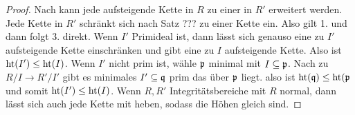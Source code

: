 \begin{proof}
	Nach  kann jede aufsteigende Kette in \(R\) zu einer in \(R'\) erweitert werden. Jede Kette in \(R'\)
	schränkt sich nach Satz ??? zu einer Kette ein. Also gilt 1. und dann folgt 3. direkt.
	Wenn \(I'\) Primideal ist, dann lässt sich genauso eine zu \( I' \) aufsteigende Kette einschränken und gibt eine zu \( I \) aufsteigende Kette.
	Also ist \( \mathrm{ht}(I')\leq \mathrm{ht}(I) \).
	Wenn \( I'\) nicht prim ist, wähle \( \mathfrak{p} \) minimal mit \(I\subseteq \mathfrak{p} \). Nach  zu 
	\( R/I \to R'/I' \) gibt es minimales \(I'\subseteq \mathfrak{q} \) prim das über \( \mathfrak{p} \) liegt.
	also ist \( \mathrm{ht}(\mathfrak{q}) \leq \mathrm{ht}(\mathfrak{p}\) und somit \(\mathrm{ht}(I') \leq \mathrm{ht}(I)\).
	Wenn \(R,R'\) Integritätsbereiche mit \( R \) normal, dann lässt sich auch jede Kette mit  heben,
	sodass die Höhen gleich sind.
\end{proof}

